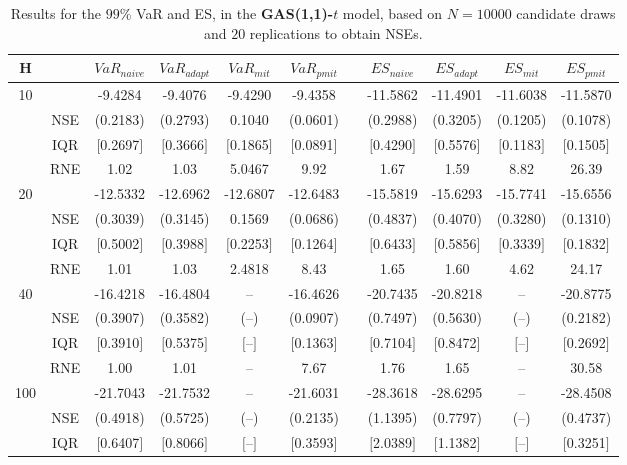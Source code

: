 \footnotesize{  
{ \renewcommand{\arraystretch}{1.3} 
\begin{longtable}{ccccccccccc}  
\caption{Results for the $99\%$ VaR and ES, in the \textbf{GAS(1,1)-$t$} model, based on $N=10000$ candidate draws and $20$ replications to obtain NSEs.} 
\label{tab:res_algos_t_gas} \\ 
 H & & $VaR_{naive}$ & $VaR_{adapt}$ & $VaR_{mit}$  & $VaR_{pmit}$ &  & $ES_{naive}$ & $ES_{adapt}$ & $ES_{mit}$ & $ES_{pmit}$ \\ \hline 
10 & & -9.4284 & -9.4076 & -9.4290 & -9.4358 & & -11.5862 & -11.4901 & -11.6038 & -11.5870  \\ 
  & NSE & (0.2183) & (0.2793) & 0.1040 & (0.0601) & & (0.2988) & (0.3205) & (0.1205) & (0.1078)   \\ 
 & IQR & $[$0.2697$]$ & $[$0.3666$]$ & $[$0.1865$]$ & $[$0.0891$]$ & & $[$0.4290$]$ & $[$0.5576$]$  &$[$0.1183$]$ & $[$0.1505$]$  \\  
  & RNE &   1.02 &   1.03 & 5.0467 &   9.92 &  &  1.67 &   1.59 &    8.82 &  26.39   \\ [1ex] 
20 & & -12.5332 & -12.6962 & -12.6807 & -12.6483 & & -15.5819 & -15.6293 & -15.7741 & -15.6556  \\ 
  & NSE & (0.3039) & (0.3145) & 0.1569 & (0.0686) & & (0.4837) & (0.4070) & (0.3280) & (0.1310)   \\ 
 & IQR & $[$0.5002$]$ & $[$0.3988$]$ & $[$0.2253$]$ & $[$0.1264$]$ & & $[$0.6433$]$ & $[$0.5856$]$  &$[$0.3339$]$ & $[$0.1832$]$  \\  
  & RNE &   1.01 &   1.03 & 2.4818 &   8.43 &  &  1.65 &   1.60 &    4.62 &  24.17   \\ [1ex] 
40 & & -16.4218 & -16.4804 & -- & -16.4626 & & -20.7435 & -20.8218 & -- & -20.8775  \\ 
  & NSE & (0.3907) & (0.3582) & (--) & (0.0907) & & (0.7497) & (0.5630) & (--) & (0.2182)   \\ 
 & IQR & $[$0.3910$]$ & $[$0.5375$]$ & $[$--$]$& $[$0.1363$]$ & & $[$0.7104$]$ & $[$0.8472$]$  &$[$--$]$& $[$0.2692$]$  \\  
  & RNE &   1.00 &   1.01 &    -- &   7.67 &  &  1.76 &   1.65 &     -- &  30.58   \\ [1ex] 
100 & & -21.7043 & -21.7532 & -- & -21.6031 & & -28.3618 & -28.6295 & -- & -28.4508  \\ 
  & NSE & (0.4918) & (0.5725) & (--) & (0.2135) & & (1.1395) & (0.7797) & (--) & (0.4737)   \\ 
 & IQR & $[$0.6407$]$ & $[$0.8066$]$ & $[$--$]$& $[$0.3593$]$ & & $[$2.0389$]$ & $[$1.1382$]$  &$[$--$]$& $[$0.3251$]$  \\  

\end{longtable}}}
